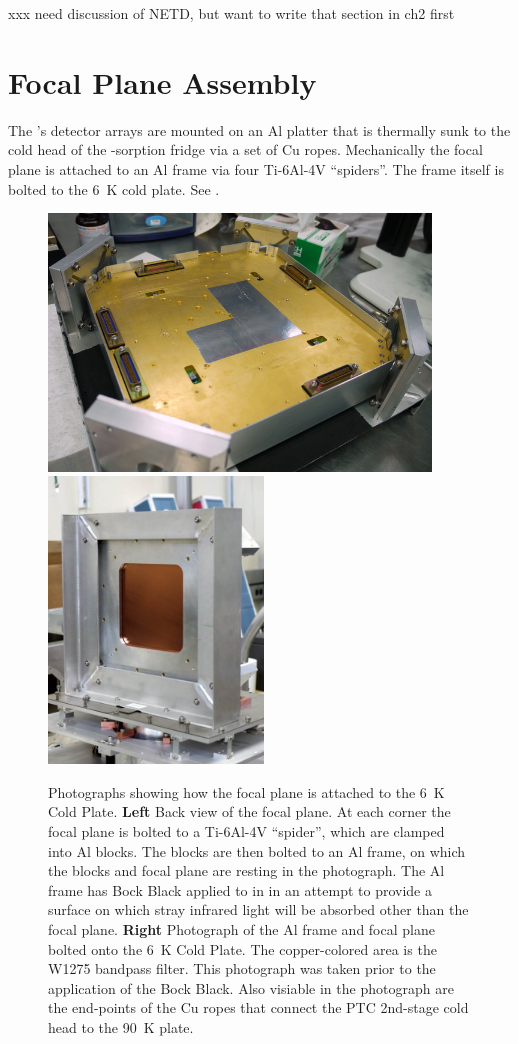 xxx need discussion of NETD, but want to write that section in ch2 first

\section{Focal Plane Assembly} \label{sec:ch5-focal-plane}

The \Imager's detector arrays are mounted on an Al platter that is thermally sunk to the cold head of the -sorption fridge via a set of Cu ropes.
Mechanically the focal plane is attached to an Al frame via four Ti-6Al-4V ``spiders''.
The frame itself is bolted to the \SI{6}{\K} cold plate.
See .

\begin{figure}
\centering
\includegraphics[width=4.00in]{images/ch5-focal-plane-back.jpg}
\includegraphics[width=2.25in]{images/ch5-focal-plane-cryostat.jpg}
\caption{
  Photographs showing how the focal plane is attached to the \SI{6}{\K} Cold Plate.
  \textbf{Left}
  Back view of the focal plane.
  At each corner the focal plane is bolted to a Ti-6Al-4V ``spider'', which are clamped into Al blocks.
  The blocks are then bolted to an Al frame, on which the blocks and focal plane are resting in the photograph.
  The Al frame has Bock Black \cite{xxx} applied to in in an attempt to provide a surface on which stray infrared light will be absorbed other than the focal plane.
  \textbf{Right}
  Photograph of the Al frame and focal plane bolted onto the \SI{6}{\K} Cold Plate.
  The copper-colored area is the W1275 bandpass filter.
  This photograph was taken prior to the application of the Bock Black.
  Also visiable in the photograph are the end-points of the Cu ropes that connect the PTC 2nd-stage cold head to the \SI{90}{\K} plate.
}
\label{fig:ch5-focal-plane-back}
\end{figure}

